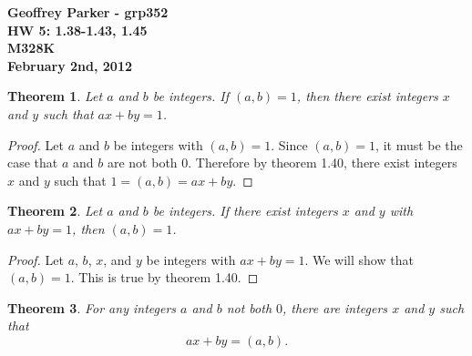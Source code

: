 \documentclass[12pt,leqno]{article}
\numberwithin{equation}{section}
\newtheorem{thm}{Theorem}[section]
\theoremstyle{definition}
\begin{document}
\thispagestyle{plain}
\begin{flushright}
\large{\textbf{Geoffrey Parker - grp352 \\
HW 5: 1.38-1.43, 1.45\\
M328K \\
February 2nd, 2012 \\}}
\end{flushright}

\markboth{}{} \setcounter{section}{0} \baselineskip=18pt

\setcounter{tocdepth}{4}



\setcounter{section}{1}

\setcounter{thm}{37}

\begin{thm}
Let $a$ and $b$ be integers. If $(a, b) = 1$, then there exist
integers $x$ and $y$ such that $ax + by = 1$.
\end{thm}

\begin{proof}[Proof]
Let $a$ and $b$ be integers with $(a, b) = 1$.  Since $(a, b) = 1$, it must be the case that $a$ and $b$ are not both $0$.  Therefore by theorem 1.40, there exist integers $x$ and $y$ such that $1 = (a, b) = ax + by$.
\end{proof}

\begin{thm}
Let $a$ and $b$ be integers. If there exist integers $x$ and $y$
with $ax + by = 1$, then $(a, b) = 1$.
\end{thm}

\begin{proof}[Proof]
Let $a$, $b$, $x$, and $y$ be integers with $ax + by = 1$.  We will show that $(a, b) = 1$.  This is true by theorem 1.40.
\end{proof}

\begin{thm}
For any integers $a$ and $b$ not both $0$, there are integers $x$
and $y$ such that \[ax + by = (a, b).\]
\end{thm}
\end{document}
